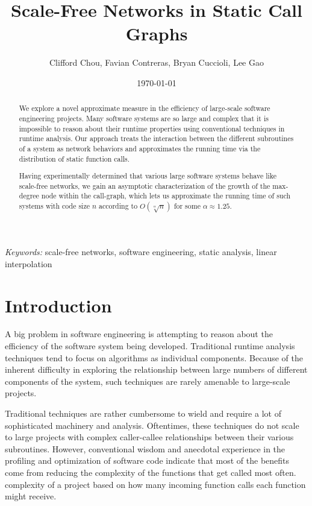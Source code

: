 \documentclass[11pt,a4paper,twocolumn]{article}
\author{Clifford Chou, Favian Contreras, Bryan Cuccioli, Lee Gao}
\title{Scale-Free Networks in Static Call Graphs}
\date{\today}
\begin{document}
\begin{singlespace}

\maketitle

\begin{abstract}
{We explore a novel approximate measure in the efficiency of large-scale
software engineering projects. Many software systems are so large and complex
that it is impossible to reason about their runtime properties using
conventional techniques in runtime analysis. Our approach treats the
interaction between the different subroutines of a system as network behaviors
and approximates the running time via the distribution of static function
calls.}

{Having experimentally determined that various large software systems
behave like scale-free networks, we gain an asymptotic characterization of the
growth of the max-degree node within the call-graph, which lets us approximate
 the running time of such systems with code size $n$ according
to $O\left(\sqrt[\alpha]{n}\right)$ for some $\alpha \approx 1.25$.}
\end{abstract}

\hspace*{3,6mm}\textit{Keywords:} {\sf \small scale-free networks, software
engineering, static analysis, linear interpolation}
\vspace{10pt}

\section{Introduction}

A big problem in software engineering is attempting to reason about
the efficiency of the software system being developed. Traditional runtime
analysis techniques tend to focus on algorithms as individual components.
Because of the inherent difficulty in exploring the relationship between
large numbers of different components of the system, such techniques are
rarely amenable to large-scale projects.

Traditional techniques are rather cumbersome to wield and require a lot of
sophisticated machinery and analysis. 
Oftentimes, these techniques do not scale to large
projects with complex caller-callee relationships between their various subroutines. 
However, conventional wisdom and anecdotal experience in the profiling and 
optimization of software code indicate
that most of the benefits come from reducing the complexity of
the functions that get called most often. %
complexity of a project based on how many incoming function calls each
function might receive.


\end{singlespace}
\end{document}
